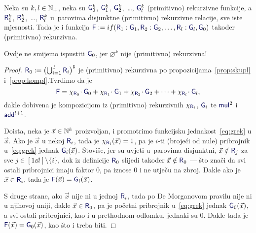 \begin{teorem}\label{tm:grek}
Neka su $k,l\in{\mathbb N}_+$, neka su $\f G_0^k$, $\f G_1^k$, $\f G_2^k$,~\ldots, $\f G_l^k$ (primitivno) rekurzivne funkcije, a $\f R_1^k$, $\f R_2^k$,~\ldots, $\f R_l^k$ u~parovima disjunktne (primitivno) rekurzivne relacije, sve iste mjesnosti. Tada je i funkcija $\f F:=\IF{\f R_1:\f G_1,\f R_2:\f G_2,\dots,\f R_l:\f G_l,\f G_0}$ također (primitivno) rekurzivna.
\end{teorem}

Ovdje ne smijemo ispustiti $\f G_0$, jer $\varnothing^k$ nije (primitivno) rekurzivna!

\begin{proof}
$\f R_0:=\bigl(\bigcup\nolimits_{i=1}^{\,l}\f R_i\bigr)\kompl$ je (primitivno) rekurzivna po propozicijama~\ref{prop:skupl} i~\ref{prop:kompl}.\newline Tvrdimo da je
\begin{equation}\label{eq:grek}
    \f F=\chi_{\f R_0}\!\cdot \f G_0+\chi_{\f R_1}\!\cdot \f G_1+\chi_{\f R_2}\!\cdot \f G_2+\dotsb+\chi_{\f R_l}\!\cdot\f G_l\text,
\end{equation}
dakle dobivena je kompozicijom iz (primitivno) rekurzivnih $\chi_{\f R_i}$, $\f G_i$ te $\f{mul}^2$ i $\f{add}^{l+1}$.

	Doista, neka je $\vec x\in{\mathbb N}^k$ proizvoljan, i promotrimo funkcijsku jednakost~\eqref{eq:grek} u $\vec x$. Ako je $\vec x$ u nekoj $\f R_i$, tada je $\chi_{\f R_i}(\vec x)=1$, pa je $i$-ti (brojeći od nule) pribrojnik u~\eqref{eq:grek} jednak $\f G_i(\vec x)$. Štoviše, jer su uvjeti u~parovima disjunktni, $\vec x\notin\f R_j$ za sve $j\in[1\dd l]\setminus\{i\}$, dok iz definicije $\f R_0$ slijedi također $\vec x\notin\f R_0$ --- što znači da svi ostali pribrojnici imaju faktor $0$, pa iznose $0$ i ne utječu na zbroj. Dakle ako je $\vec x\in\f R_i$, tada je $\f F(\vec x)=\f G_i(\vec x)$.

S druge strane, ako $\vec x$ nije ni u jednoj $\f R_i$, tada po De Morganovom pravilu nije ni u njihovoj uniji, dakle $\vec x\in\f R_0$, pa je početni pribrojnik u~\eqref{eq:grek} jednak $\f G_0(\vec x)$, a svi ostali pribrojnici, kao i u prethodnom odlomku, jednaki su $0$. Dakle tada je $\f F(\vec x)=\f G_0(\vec x)$, kao što i treba biti.
\end{proof}


